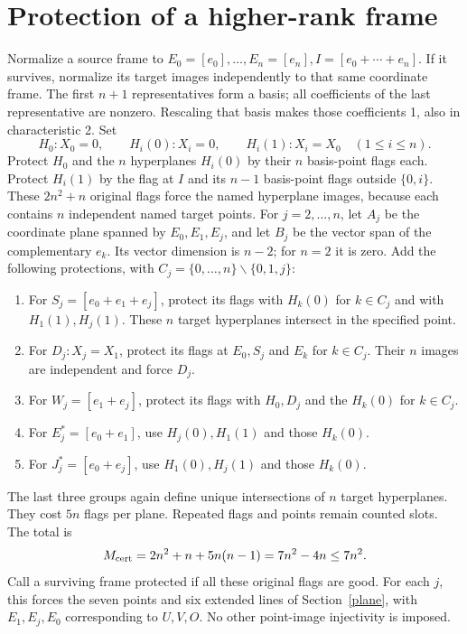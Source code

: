 \documentclass[11pt]{article}
\begin{document}
\section{Protection of a higher-rank frame}\label{protection}
Normalize a source frame to
$E_0=[e_0],\ldots,E_n=[e_n], I=[e_0+\cdots+e_n]$.
If it survives, normalize its target images independently to that same
coordinate frame. The first $n+1$ representatives form a basis; all
coefficients of the last representative are nonzero. Rescaling that
basis makes those coefficients 1, also in characteristic 2.
Set
\[
 H_0:X_0=0,\qquad H_i(0):X_i=0,\qquad H_i(1):X_i=X_0\quad(1\leq i\leq n).
\]
Protect $H_0$ and the $n$ hyperplanes $H_i(0)$ by their $n$ basis-point
flags each. Protect $H_i(1)$ by the flag at $I$ and its $n-1$ basis-point
flags outside $\{0,i\}$. These $2n^2+n$ original flags force the named
hyperplane images, because each contains $n$ independent named target
points.
For $j=2,\ldots,n$, let $A_j$ be the coordinate plane spanned by
$E_0,E_1,E_j$, and let $B_j$ be the vector span of the complementary
$e_k$. Its vector dimension is $n-2$; for $n=2$ it is zero. Add the
following protections, with $C_j=\{0,\ldots,n\}\smallsetminus\{0,1,j\}$:
\begin{enumerate}
\item For $S_j=[e_0+e_1+e_j]$, protect its flags with $H_k(0)$ for
$k\in C_j$ and with $H_1(1),H_j(1)$. These $n$ target hyperplanes
intersect in the specified point.
\item For $D_j:X_j=X_1$, protect its flags at $E_0,S_j$ and $E_k$ for
$k\in C_j$. Their $n$ images are independent and force $D_j$.
\item For $W_j=[e_1+e_j]$, protect its flags with $H_0,D_j$ and the
$H_k(0)$ for $k\in C_j$.
\item For $E_j^*=[e_0+e_1]$, use $H_j(0),H_1(1)$ and those $H_k(0)$.
\item For $J_j^*=[e_0+e_j]$, use $H_1(0),H_j(1)$ and those $H_k(0)$.
\end{enumerate}
The last three groups again define unique intersections of $n$ target
hyperplanes. They cost $5n$ flags per plane. Repeated flags and points
remain counted slots. The total is
\begin{equation}\label{certificate}
 M_{\rm cert}=2n^2+n+5n(n-1)=7n^2-4n\leq7n^2.
\end{equation}
Call a surviving frame protected if all these original flags are good.
For each $j$, this forces the seven points and six extended lines of
Section~\ref{plane}, with $E_1,E_j,E_0$ corresponding to $U,V,O$.
No other point-image injectivity is imposed.
\end{document}
